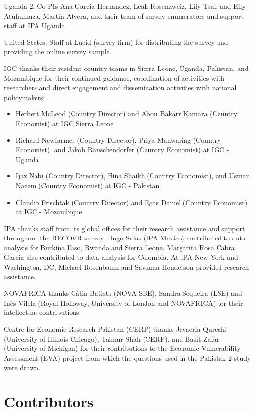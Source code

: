 \documentclass[
  12pt,
]{article}
\providecommand{\tightlist}{%
  \setlength{\itemsep}{0pt}\setlength{\parskip}{0pt}}
\begin{document}
Uganda 2: Co-PIs Ana Garcia Hernandez, Leah Rosenzweig, Lily Tsai, and Elly Atuhumuza, Martin Atyera, and their team of survey enumerators and support staff at IPA Uganda.

United States: Staff at Lucid (survey firm) for distributing the survey and providing the online survey sample.

IGC thanks their resident country teams in Sierra Leone, Uganda, Pakistan, and Mozambique for their continued guidance, coordination of activities with researchers and direct engagement and dissemination activities with national policymakers:

\begin{itemize}
\tightlist
\item
  Herbert McLeod (Country Director) and Abou Bakarr Kamara (Country Economist) at IGC Sierra Leone
\item
  Richard Newfarmer (Country Director), Priya Manwaring (Country Economist), and Jakob Rauschendorfer (Country Economist) at IGC - Uganda
\item
  Ijaz Nabi (Country Director), Hina Shaikh (Country Economist), and Usman Naeem (Country Economist) at IGC - Pakistan
\item
  Claudio Frischtak (Country Director) and Egas Daniel (Country Economist) at IGC - Mozambique
\end{itemize}

IPA thanks staff from its global offices for their research assistance and support throughout the RECOVR survey. Hugo Salas (IPA Mexico) contributed to data analysis for Burkina Faso, Rwanda and Sierra Leone. Margarita Rosa Cabra Garcia also contributed to data analysis for Colombia. At IPA New York and Washington, DC, Michael Rosenbaum and Savanna Henderson provided research assistance.

NOVAFRICA thanks Cátia Batista (NOVA SBE), Sandra Sequeira (LSE) and Inês Vilela (Royal Holloway, University of London and NOVAFRICA) for their intellectual contributions.

Centre for Economic Research Pakistan (CERP) thanks Javaeria Qureshi (University of Illinois Chicago), Taimur Shah (CERP), and Basit Zafar (University of Michigan) for their contributions to the Economic Vulnerability Assessment (EVA) project from which the questions used in the Pakistan 2 study were drawn.

\hypertarget{contributors}{%
\section*{Contributors}\label{contributors}}
\end{document}
